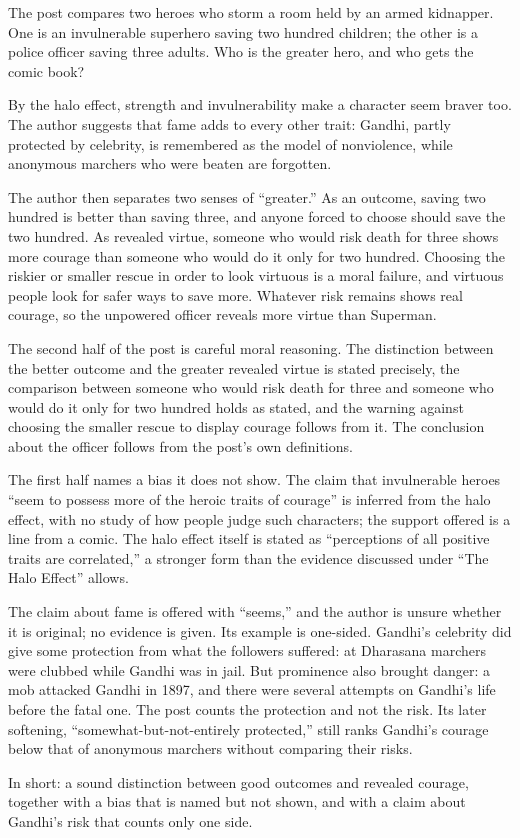\begin{afterword}
\summaryhead

The post compares two heroes who storm a room held by an armed kidnapper. One is an invulnerable superhero saving two hundred children; the other is a police officer saving three adults. Who is the greater hero, and who gets the comic book?

By the halo effect, strength and invulnerability make a character seem braver too. The author suggests that fame adds to every other trait: Gandhi, partly protected by celebrity, is remembered as the model of nonviolence, while anonymous marchers who were beaten are forgotten.

The author then separates two senses of ``greater.'' As an outcome, saving two hundred is better than saving three, and anyone forced to choose should save the two hundred. As revealed virtue, someone who would risk death for three shows more courage than someone who would do it only for two hundred. Choosing the riskier or smaller rescue in order to look virtuous is a moral failure, and virtuous people look for safer ways to save more. Whatever risk remains shows real courage, so the unpowered officer reveals more virtue than Superman.

\responsehead

The second half of the post is careful moral reasoning. The distinction between the better outcome and the greater revealed virtue is stated precisely, the comparison between someone who would risk death for three and someone who would do it only for two hundred holds as stated, and the warning against choosing the smaller rescue to display courage follows from it. The conclusion about the officer follows from the post's own definitions.

The first half names a bias it does not show. The claim that invulnerable heroes ``seem to possess more of the heroic traits of courage'' is inferred from the halo effect, with no study of how people judge such characters; the support offered is a line from a comic. The halo effect itself is stated as ``perceptions of all positive traits are correlated,'' a stronger form than the evidence discussed under ``The Halo Effect'' allows.

The claim about fame is offered with ``seems,'' and the author is unsure whether it is original; no evidence is given. Its example is one-sided. Gandhi's celebrity did give some protection from what the followers suffered: at Dharasana marchers were clubbed while Gandhi was in jail. But prominence also brought danger: a mob attacked Gandhi in 1897, and there were several attempts on Gandhi's life before the fatal one. The post counts the protection and not the risk. Its later softening, ``somewhat-but-not-entirely protected,'' still ranks Gandhi's courage below that of anonymous marchers without comparing their risks.

In short: a sound distinction between good outcomes and revealed courage, together with a bias that is named but not shown, and with a claim about Gandhi's risk that counts only one side.
\end{afterword}
